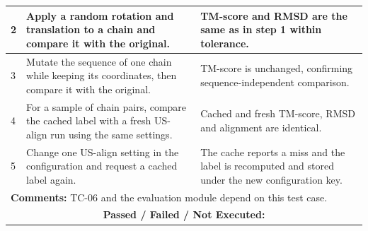 \documentclass{FastFyp}
\begin{document}
{\begin{longtable}{|p{2.4cm}|p{4.6cm}|p{2.4cm}|p{3.8cm}|}
2 & Apply a random rotation and translation to a chain and compare it with the original. & \multicolumn{2}{p{6.64cm}|}{TM-score and RMSD are the same as in step 1 within tolerance.} \\ \hline
3 & Mutate the sequence of one chain while keeping its coordinates, then compare it with the original. & \multicolumn{2}{p{6.64cm}|}{TM-score is unchanged, confirming sequence-independent comparison.} \\ \hline
4 & For a sample of chain pairs, compare the cached label with a fresh US-align run using the same settings. & \multicolumn{2}{p{6.64cm}|}{Cached and fresh TM-score, RMSD and alignment are identical.} \\ \hline
5 & Change one US-align setting in the configuration and request a cached label again. & \multicolumn{2}{p{6.64cm}|}{The cache reports a miss and the label is recomputed and stored under the new configuration key.} \\ \hline
\multicolumn{4}{|p{14.51cm}|}{\textbf{Comments:} TC-06 and the evaluation module depend on this test case.} \\ \hline
\multicolumn{4}{|c|}{\textbf{Passed / Failed / Not Executed:}} \\ \hline
\end{longtable}
}
\end{document}

